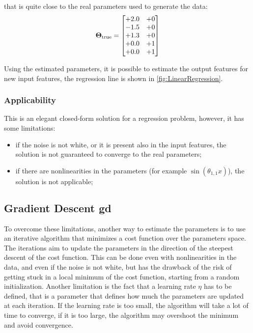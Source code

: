 that is quite close to the real parameters used to generate the data:
\begin{equation*}
    \bm{\Theta}_{\text{true}} = 
    \begin{bmatrix}
        +2.0 & +0 \\
        -1.5 & +0 \\
        +1.3 & +0 \\
        +0.0 & +1 \\
        +0.0 & +1 
    \end{bmatrix}
\end{equation*}

Using the estimated parameters, it is possible to estimate the output features for new input features, the regression line is shown in \autoref{fig:LinearRegression}.

\subsubsection{Applicability}
This is an elegant closed-form solution for a regression problem, however, it has some limitations:
\begin{itemize}
    \item if the noise is not white, or it is present also in the input features, the solution is not guaranteed to converge to the real parameters;
    \item if there are nonlinearities in the parameters (for example $\sin(\theta_{1,1}x)$), the solution is not applicable;
\end{itemize}

\subsection{Gradient Descent \gls{gd}}
To overcome these limitations, another way to estimate the parameters is to use an iterative algorithm that minimizes a cost function over the parameters space. The iterations aim to update the parameters in the direction of the steepest descent of the cost function. This can be done even with nonlinearities in the data, and even if the noise is not white, but has the drawback of the risk of getting stuck in a local minimum of the cost function, starting from a random initialization.
Another limitation is the fact that a learning rate $\eta$ has to be defined, that is a parameter that defines how much the parameters are updated at each iteration. If the learning rate is too small, the algorithm will take a lot of time to converge, if it is too large, the algorithm may overshoot the minimum and avoid convergence.

